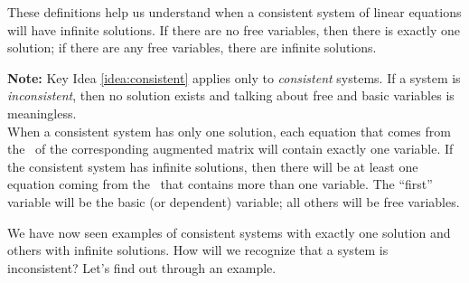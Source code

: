 These definitions help us understand when a consistent system of linear equations will have infinite solutions. If there are no free variables, then there is exactly one solution; if there are any free variables, there are infinite solutions. 

\smallskip


\smallskip

\textsf{\textbf{Note:}} Key Idea \ref{idea:consistent} applies only to \textit{consistent} systems. If a system is \textit{inconsistent}, then no solution exists and talking about free and basic variables is meaningless.\\

When a consistent system has only one solution, each equation that comes from the \rref\ of the corresponding augmented matrix will contain exactly one variable. If the consistent system has infinite solutions, then there will be at least one equation coming from the \rref\ that contains more than one variable. The ``first'' variable will be the basic (or dependent) variable; all others will be free variables. 

We have now seen examples of consistent systems with exactly one solution and others with infinite solutions. How will we recognize that a system is inconsistent? Let's find out through an example.


